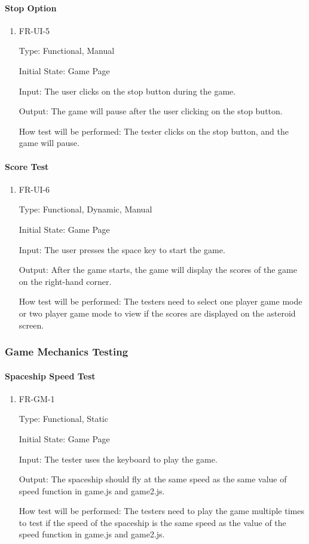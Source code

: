 \documentclass[12pt, titlepage]{article}
\begin{document}
\paragraph{Stop Option}
\begin{enumerate}					
\item{FR-UI-5\\}

Type: Functional, Manual
					
Initial State: Game Page
					
Input: The user clicks on the stop button during the game.
					
Output: The game will pause after the user clicking on the stop button.  
					
How test will be performed:  The tester clicks on the stop button, and the game will pause.

\end{enumerate}

\paragraph{Score Test}
\begin{enumerate}					
\item{FR-UI-6\\}

Type: Functional, Dynamic, Manual
					
Initial State: Game Page
					
Input: The user presses the space key to start the game.
					
Output: After the game starts, the game will display the scores of the game on the right-hand corner.
					
How test will be performed:  The testers need to select one player game mode or two player game mode to view if the scores are displayed on the asteroid screen.
\end{enumerate}



\subsubsection{Game Mechanics Testing}
\paragraph{Spaceship Speed Test}
\begin{enumerate}					
\item{FR-GM-1\\}

Type: Functional, Static
					
Initial State: Game Page
					
Input: The tester uses the keyboard to play the game.
					
Output: The spaceship should fly at the same speed as the same value of speed function in game.js and game2.js. 
			
How test will be performed:  The testers need to play the game multiple times to test if the speed of the spaceship is the same speed as the value of the speed function in game.js and game2.js. 
\end{enumerate}
\end{document}
